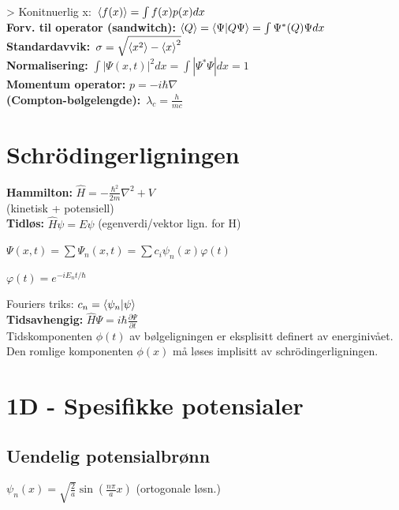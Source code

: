 \documentclass[10p,a4paper]{article}
\newcommand{\pptw}{\frac{\partial \Psi}{\partial t}}
\renewcommand{\exp}{e^}
\begin{document}
> Konitnuerlig x: $\expval{f(x)} = \int f(x) p(x) dx$
\\

\textbf{Forv. til operator (sandwitch):} $\expval{Q} = \bra{\Psi}\ket{Q\Psi} = \int \Psi^* (Q) \Psi dx$
\\

\textbf{Standardavvik:} $\sigma = \sqrt{\expval{x^2} - \expval{x}^2}$
\\

\textbf{Normalisering:} $\int |\Psi(x,t)|^2 dx = \int |\Psi^*\Psi| dx = 1$
\\

\textbf{Momentum operator:} $p = -i\hbar\nabla$
\\

\textbf{(Compton-bølgelengde):} $\lambda_c = \frac{h}{mc}$




\section*{Schrödingerligningen}

\textbf{Hammilton:} $\hat{H} = -\frac{\hbar^2}{2m}\nabla^2 + V$\\
(kinetisk + potensiell)
\\

\textbf{Tidløs:} $\hat{H}\psi = E\psi$ (egenverdi/vektor lign. for H)

$\Psi(x,t) = \sum \Psi_n(x,t) = \sum c_i \psi_n(x)\varphi(t)$

$\varphi(t) = \exp{-iE_nt/\hbar}$

Fouriers triks: $c_n = \bra{\psi_n}\ket{\psi}$
\\

\textbf{Tidsavhengig:} $\hat{H}\Psi = i\hbar\pptw$
\\

Tidskomponenten $\phi(t)$ av bølgeligningen er eksplisitt definert av energinivået. Den romlige komponenten $\phi(x)$ må løses implisitt av schrödingerligningen.




\section*{1D - Spesifikke potensialer}

\subsection*{Uendelig potensialbrønn}
$\psi_n(x) = \sqrt{\frac{2}{a}}\sin(\frac{n\pi}{a}x)$ \quad\quad (ortogonale løsn.)
\end{document}
